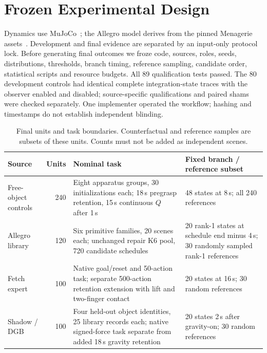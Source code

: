 \section{Frozen Experimental Design}
\label{sec:design}
Dynamics use MuJoCo~\citep{todorov2012mujoco,mujoco_computation}; the Allegro
model derives from the pinned Menagerie assets~\citep{mujoco_menagerie}.
Development and final evidence are separated by an input-only protocol lock.
Before generating final outcomes we froze code, sources, roles, seeds,
distributions, thresholds, branch timing, reference sampling, candidate order,
statistical scripts and resource budgets. All 89 qualification tests passed.
The 80 development controls had identical complete integration-state traces
with the observer enabled and disabled; source-specific qualifications and
paired shams were checked separately. One implementer operated the workflow;
hashing and timestamps do not establish independent blinding.

\begin{table}[t]
\centering\small
\caption{Final units and task boundaries. Counterfactual and reference samples
are subsets of these units. Counts must not be added as independent scenes.}
\label{tab:design}
\begin{tabularx}{\linewidth}{l r Y Y}
\toprule
Source & Units & Nominal task & Fixed branch / reference subset\\
\midrule
Free-object controls & 240 & Eight apparatus groups, 30 initializations each;
18\,s pregrasp retention, 15\,s continuous $Q$ after 1\,s & 48 states at 8\,s; all 240 references\\
Allegro library & 120 & Six primitive families, 20 scenes each; unchanged repair
K6 pool, 720 candidate schedules & 20 rank-1 states at schedule end minus 4\,s;
30 randomly sampled rank-1 references\\
Fetch expert & 100 & Native goal/reset and 50-action task; separate 500-action
retention extension with lift and two-finger contact & 20 states at 16\,s;
30 random references\\
Shadow / DGB & 100 & Four held-out object identities, 25 library records each;
native signed-force task separate from added 18\,s gravity retention & 20 states
2\,s after gravity-on; 30 random references\\
\bottomrule
\end{tabularx}
\end{table}

